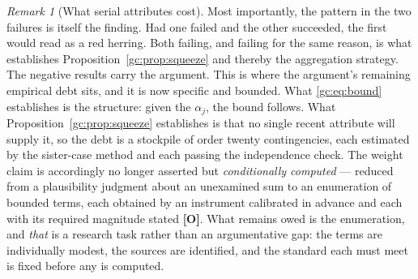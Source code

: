 \documentclass[11pt]{article}
\numberwithin{equation}{section}
\theoremstyle{plain}
\theoremstyle{definition}
\theoremstyle{remark}
\newtheorem{remark}[theorem]{Remark}
\begin{document}
\begin{remark}[What serial attributes cost]
Most importantly, the pattern in the two failures is itself the
finding. Had one failed and the other succeeded, the first would read as
a red herring. Both failing, and failing for the same reason, is what
establishes Proposition~\ref{gc:prop:squeeze} and thereby the
aggregation strategy. The negative results carry the argument. This is where the argument's remaining empirical debt sits, and it is
now specific and bounded. What \eqref{gc:eq:bound} establishes is the
structure: given the $\alpha_j$, the bound follows. What
Proposition~\ref{gc:prop:squeeze} establishes is that no single recent
attribute will supply it, so the debt is a stockpile of order twenty
contingencies, each estimated by the sister-case method and each passing
the independence check. The weight claim is accordingly no longer
asserted but \emph{conditionally computed} --- reduced from a
plausibility judgment about an unexamined sum to an enumeration of
bounded terms, each obtained by an instrument calibrated in advance and
each with its required magnitude stated \textbf{[O]}. What remains owed
is the enumeration, and \emph{that} is a research task rather than an
argumentative gap: the terms are individually modest, the sources are
identified, and the standard each must meet is fixed before any is
computed.
\end{remark}
\end{document}
